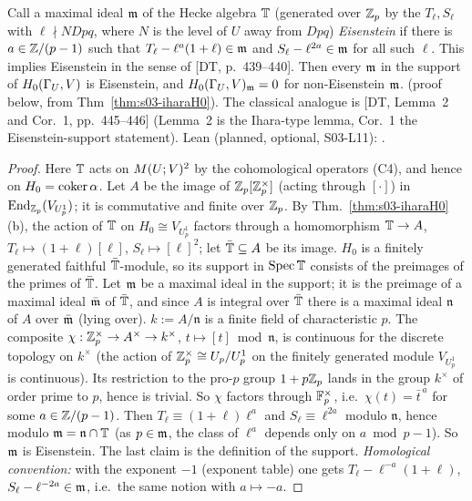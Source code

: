 \begin{corollary}\label{cor:s03-eis}
Call a maximal ideal $\mathfrak{m}$ of the Hecke algebra $\mathbb{T}$ (generated over $\mathbb{Z}_p$ by the $T_\ell,S_\ell$ with $\ell\nmid NDpq$, where $N$ is the level of $U$ away from $Dpq$) \emph{Eisenstein}
if there is $a\in\mathbb{Z}/(p-1)$ such that $T_\ell-\ell^a(1+\ell)\in\mathfrak{m}$ and $S_\ell-\ell^{2a}\in\mathfrak{m}$ for all such $\ell$. This implies
Eisenstein in the sense of [DT, p.~439--440]. Then every $\mathfrak{m}$ in the support of $H_0(\Gamma_U,V)$ is Eisenstein, and
$H_0(\Gamma_U,V)_{\mathfrak{m}}=0$ for non-Eisenstein $\mathfrak{m}$. \stpmc{} (proof below, from Thm~\ref{thm:s03-iharaH0}). The classical analogue is [DT,
Lemma~2 and Cor.~1, pp.~445--446] \stcited{}  (Lemma~2 is the Ihara-type lemma, Cor.~1 the Eisenstein-support statement).
Lean (planned, optional, S03-L11): . \leanplanned
\end{corollary}
\begin{proof}
Here $\mathbb{T}$ acts on $M(U;V)^2$ by the cohomological operators (C4), and hence on $H_0=\operatorname{coker}\alpha$. Let $A$ be the
image of $\mathbb{Z}_p[\mathbb{Z}_p^\times]$ (acting through $[\cdot]$) in $\operatorname{End}_{\mathbb{Z}_p}(V_{U^1_p})$; it is commutative and finite over $\mathbb{Z}_p$. By Thm.~\ref{thm:s03-iharaH0}(b), the action
of $\mathbb{T}$ on $H_0\cong V_{U^1_p}$ factors through a homomorphism $\mathbb{T}\to A$, $T_\ell\mapsto(1+\ell)[\ell]$, $S_\ell\mapsto[\ell]^2$; let $\bar{\mathbb{T}}\subseteq A$ be its image.
$H_0$ is a finitely generated faithful $\bar{\mathbb{T}}$-module, so its support in $\mathrm{Spec}\,\mathbb{T}$ consists of the preimages of the primes of $\bar{\mathbb{T}}$. Let $\mathfrak{m}$ be a
maximal ideal in the support; it is the preimage of a maximal ideal $\bar{\mathfrak{m}}$ of $\bar{\mathbb{T}}$, and since $A$ is integral over $\bar{\mathbb{T}}$ there is a maximal ideal $\mathfrak n$
of $A$ over $\bar{\mathfrak{m}}$ (lying over). $k:=A/\mathfrak n$ is a finite field of characteristic $p$. The composite $\chi:\mathbb{Z}_p^\times\to A^\times\to k^\times$, $t\mapsto[t]\bmod\mathfrak n$,
is continuous for the discrete topology on $k^\times$ (the action of $\mathbb{Z}_p^\times\cong U_p/U^1_p$ on the finitely generated module $V_{U^1_p}$ is continuous). Its restriction to the
pro-$p$ group $1+p\mathbb{Z}_p$ lands in the group $k^\times$ of order prime to $p$, hence is trivial. So $\chi$ factors through $\mathbb{F}_p^\times$, i.e.\ $\chi(t)=\bar t^{\,a}$ for some
$a\in\mathbb{Z}/(p-1)$. Then $T_\ell\equiv(1+\ell)\ell^a$ and $S_\ell\equiv\ell^{2a}$ modulo $\mathfrak n$, hence modulo $\mathfrak{m}=\mathfrak n\cap\mathbb{T}$ (as $p\in\mathfrak{m}$, the class of
$\ell^a$ depends only on $a\bmod p-1$). So $\mathfrak{m}$ is Eisenstein. The last claim is the definition of the support.
\emph{Homological convention:} with the exponent $-1$ (exponent table) one gets $T_\ell-\ell^{-a}(1+\ell)$, $S_\ell-\ell^{-2a}\in\mathfrak{m}$, i.e.\ the same notion with
$a\mapsto-a$.
\end{proof}

